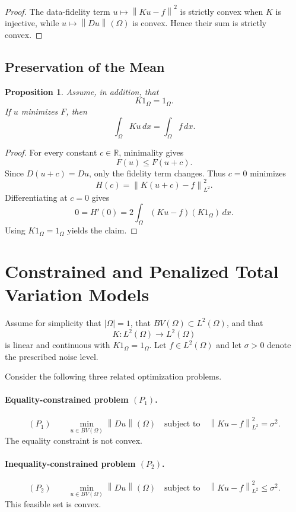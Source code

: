 \documentclass[11pt]{article}
\newcommand{\Om}{\Omega}
\newcommand{\R}{\mathbb{R}}
\newcommand{\norm}[2][]{\left\lVert #2\right\rVert_{#1}}
\theoremstyle{definition}
\theoremstyle{plain}
\newtheorem{proposition}[definition]{Proposition}
\begin{document}
\begin{proof}
The data-fidelity term $u\mapsto\norm{Ku-f}^2$ is strictly convex when $K$ is injective, while $u\mapsto\norm{Du}(\Om)$ is convex. Hence their sum is strictly convex.
\end{proof}

\subsection{Preservation of the Mean}
\begin{proposition}
Assume, in addition, that
\[
K1_{\Om}=1_{\Om}.
\]
If $u$ minimizes $F$, then
\[
\int_{\Om}Ku\,dx=\int_{\Om}f\,dx.
\]
\end{proposition}

\begin{proof}
For every constant $c\in\R$, minimality gives
\[
F(u)\le F(u+c).
\]
Since $D(u+c)=Du$, only the fidelity term changes. Thus $c=0$ minimizes
\[
H(c)=\norm[L^2]{K(u+c)-f}^2.
\]
Differentiating at $c=0$ gives
\[
0=H'(0)=2\int_{\Om}(Ku-f)(K1_{\Om})\,dx.
\]
Using $K1_{\Om}=1_{\Om}$ yields the claim.
\end{proof}

\section{Constrained and Penalized Total Variation Models}

Assume for simplicity that $|\Om|=1$, that $BV(\Om)\subset L^2(\Om)$, and that
\[
K:L^2(\Om)\to L^2(\Om)
\]
is linear and continuous with $K1_{\Om}=1_{\Om}$. Let $f\in L^2(\Om)$ and let $\sigma>0$ denote the prescribed noise level.

Consider the following three related optimization problems.

\paragraph{Equality-constrained problem $(P_1)$.}
\[
(P_1)\qquad
\min_{u\in BV(\Om)}\norm{Du}(\Om)
\quad\text{subject to}\quad
\norm[L^2]{Ku-f}^2=\sigma^2.
\]
The equality constraint is not convex.

\paragraph{Inequality-constrained problem $(P_2)$.}
\[
(P_2)\qquad
\min_{u\in BV(\Om)}\norm{Du}(\Om)
\quad\text{subject to}\quad
\norm[L^2]{Ku-f}^2\le\sigma^2.
\]
This feasible set is convex.
\end{document}
